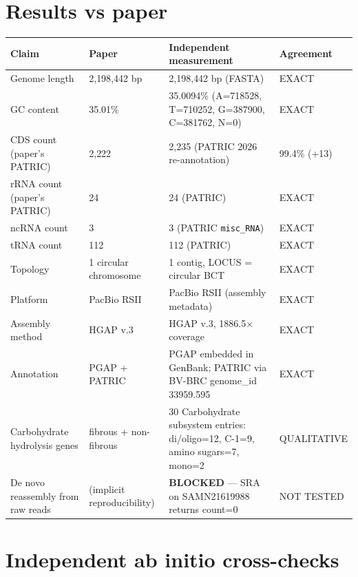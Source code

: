 \documentclass[11pt,letterpaper]{article}
\begin{document}
\section{Results vs paper}

\begin{longtable}{p{}p{}p{}p{}}
\toprule
\textbf{Claim} & \textbf{Paper} & \textbf{Independent measurement} & \textbf{Agreement} \\
\midrule
\endhead
Genome length & 2{,}198{,}442 bp & 2{,}198{,}442 bp (FASTA) & EXACT \\
GC content & 35.01\% & 35.0094\% (A=718528, T=710252, G=387900, C=381762, N=0) & EXACT \\
CDS count (paper's PATRIC) & 2{,}222 & 2{,}235 (PATRIC 2026 re-annotation) & 99.4\% (+13) \\
rRNA count (paper's PATRIC) & 24 & 24 (PATRIC) & EXACT \\
ncRNA count & 3 & 3 (PATRIC \texttt{misc\_RNA}) & EXACT \\
tRNA count & 112 & 112 (PATRIC) & EXACT \\
Topology & 1 circular chromosome & 1 contig, LOCUS = circular BCT & EXACT \\
Platform & PacBio RSII & PacBio RSII (assembly metadata) & EXACT \\
Assembly method & HGAP v.3 & HGAP v.3, 1886.5$\times$ coverage & EXACT \\
Annotation & PGAP + PATRIC & PGAP embedded in GenBank; PATRIC via BV-BRC genome\_id 33959.595 & EXACT \\
Carbohydrate hydrolysis genes & fibrous + non-fibrous & 30 Carbohydrate subsystem entries: di/oligo=12, C-1=9, amino sugars=7, mono=2 & QUALITATIVE \\
De novo reassembly from raw reads & (implicit reproducibility) & \textbf{BLOCKED} --- SRA on SAMN21619988 returns count=0 & NOT TESTED \\
\bottomrule
\end{longtable}

\section{Independent ab initio cross-checks}
\end{document}
